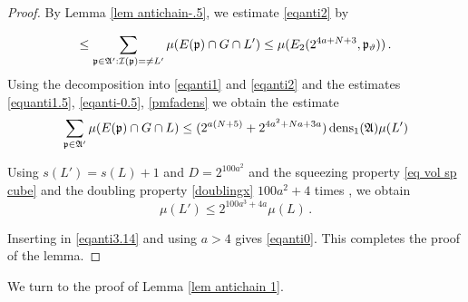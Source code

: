 \begin{proof}
    By Lemma \ref{lem antichain-.5}, we estimate \eqref{eqanti2} by

    \begin{equation}\label{eqanti0.5}
    \le \sum_{\mathfrak p\in\mathfrak{A}':\mathcal{I}(\mathfrak p)=\neq L'}\mu(E(\mathfrak p)\cap G\cap L')
    \le  \mu (E_2(2^{4a+N+3},\mathfrak p_{\vartheta}))
    \, .
\end{equation}
Using the decomposition
into \eqref{eqanti1} and
\eqref{eqanti2} and the estimates
\eqref{equanti1.5},
\eqref{eqanti-0.5},
\eqref{pmfadens} we obtain the estimate
\begin{equation}\label{eqanti3.14}
\sum_{\mathfrak p\in\mathfrak{A}'}\mu(E(\mathfrak p)\cap G \cap L)
    \le (2^{a(N+5)}+2^{4a^2+Na+3a})\operatorname{\operatorname{dens}}_1(\mathfrak{A})\mu(L')
\end{equation}



    Using $s(L')=s(L)+1$ and $D=2^{100a^2}$ and the
squeezing property \eqref{eq vol sp cube}
and the doubling property \eqref{doublingx} $100a^2+4$ times , we obtain
\begin{equation}
    \mu(L')\le 2^{100a^3+4a}\mu(L)\, .
\end{equation}


Inserting in \eqref{eqanti3.14} and using $a>4$ gives \eqref{eqanti0}.
This completes the proof of the lemma.
\end{proof}



We turn to the proof of Lemma \ref{lem antichain 1}.




